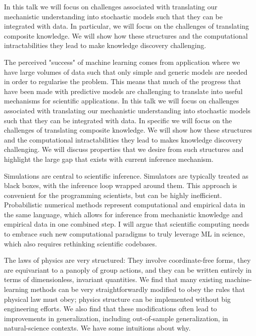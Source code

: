 \documentclass[a4paper,UKenglish]{dagrep-v2021}
\begin{document}
In this talk we will focus on challenges associated with translating our mechanistic understanding into stochastic models such that they can be integrated with data. In particular, we will focus on the challenges of translating composite knowledge. We will show how these structures and the computational intractabilities they lead to make knowledge discovery challenging. 

The perceived "success" of machine learning comes from application where we have large volumes of data such that only simple and generic models are needed in order to regularise the problem. This means that much of the progress that have been made with predictive models are challenging to translate into useful mechanisms for scientific applications. In this talk we will focus on challenges associated with translating our mechanistic understanding into stochastic models such that they can be integrated with data. In specific we will focus on the challenges of translating composite knowledge. We will show how these structures and the computational intractabilities they lead to makes knowledge discovery challenging. We will discuss properties that we desire from such structures and highlight the large gap that exists with current inference mechanism.

\license

Simulations are central to scientific inference. Simulators are typically treated as black boxes, with the inference loop wrapped around them. This approach is convenient for the programming scientists, but can be highly inefficient. Probabilistic numerical methods represent computational and empirical data in the same language, which allows for inference from mechanistic knowledge and empirical data in one combined step. I will argue that scientific computing needs to embrace such new computational paradigms to truly leverage ML in science, which also requires rethinking scientific codebases.

\license

The laws of physics are very structured: They involve coordinate-free forms, they are equivariant to a panoply of group actions, and they can be written entirely in terms of dimensionless, invariant quantities. We find that many existing machine-learning methods can be very straightforwardly modified to obey the rules that physical law must obey; physics structure can be implemented without big engineering efforts. We also find that these modifications often lead to improvements in generalization, including out-of-sample generalization, in natural-science contexts. We have some intuitions about why.
\end{document}
